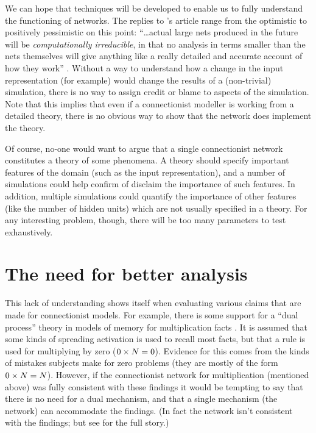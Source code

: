 We can hope that techniques will be developed to enable us to fully
understand the functioning of networks. The replies to
\citeauthor{hanswhat}'s article range from the optimistic to positively
pessimistic on this point: ``\ldots actual large nets produced in the
future will be {\em computationally irreducible}, in that no analysis in
terms smaller than the nets themselves will give anything like a really
detailed and accurate account of how they work'' \cite[p.~508]{suppprob}.
Without a way to understand how a change in the input representation (for
example) would change the results of a (non-trivial) simulation, there is
no way to assign credit or blame to aspects of the simulation. Note that
this implies that even if a connectionist modeller is working from a
detailed theory, there is  no obvious way to show that the network does
implement the theory.


Of course, no-one would want to argue that a single connectionist network
constitutes a theory of some phenomena. A theory should specify important
features of the domain (such as the input
representation), and a number of simulations
could help confirm of disclaim the importance of such features.  In
addition, multiple simulations could quantify the importance of other
features (like the number of hidden units) which are not usually specified
in a theory. For any interesting problem, though, there will be too many
parameters to test exhaustively.



\section*{The need for better analysis}

This lack of understanding shows itself when evaluating various claims that
are made for connectionist models. For example, there is some support for a
``dual process'' theory in models of memory for multiplication facts
\cite{mcclfact}.  It is assumed that some kinds of spreading activation is
used to recall most facts, but that a rule is used for multiplying by zero
($\mbox{$0\times N$}=0$).  Evidence for this comes from the kinds of mistakes subjects
make for zero problems (they are mostly of the form $\mbox{$0\times N$}=N$). However, if
the connectionist network for multiplication (mentioned above) was fully
consistent with these findings it would be tempting to say that there is no
need for a dual mechanism, and that a single mechanism (the network) can
accommodate the findings.  (In fact the network isn't consistent with the
findings; but see  for the full story.)

